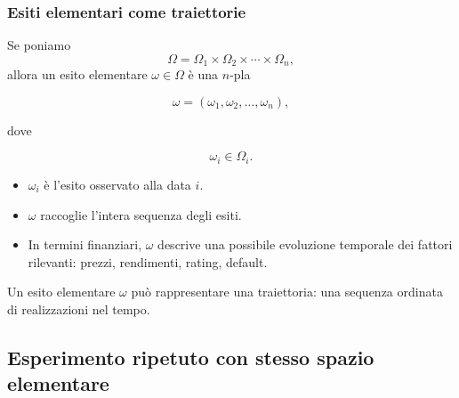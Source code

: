 \documentclass[handout]{beamer}%
\newenvironment{stepitemize}{\begin{itemize}[<+->]}{\end{itemize} }
\providecommand{\1}{\mathbf{1}}
\providecommand{\QTR}[2]{\csname #1\endcsname{#2}}
\begin{document}
\begin{frame}%
%

\frametitle{Esiti elementari come traiettorie}%


Se poniamo
\[
\Omega=\Omega_{1}\times\Omega_{2}\times\cdots\times\Omega_{n},
\]
allora un esito elementare $\omega\in\Omega$ \`{e} una $n$-pla%

\[
\omega=(\omega_{1},\omega_{2},\ldots,\omega_{n}),
\]


dove%

\[
\omega_{i}\in\Omega_{i}.
\]


\medskip

\begin{stepitemize}
\item $\omega_{i}$ \`{e} l'esito osservato alla data $i$.

\item $\omega$ raccoglie l'intera sequenza degli esiti.

\item In termini finanziari, $\omega$ descrive una possibile evoluzione
temporale dei fattori rilevanti: prezzi, rendimenti, rating, default.
\end{stepitemize}

\medskip

\begin{center}
{\small Un esito elementare $\omega$ pu\`{o} rappresentare una traiettoria:
una sequenza ordinata di realizzazioni nel tempo.}
\end{center}%

\transboxout
\end{frame}%




\subsection{Esperimento ripetuto con stesso spazio elementare}%
\end{document}
